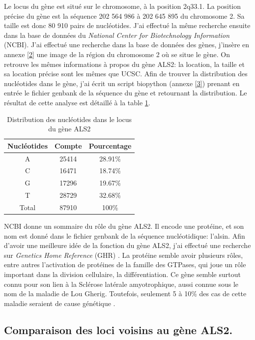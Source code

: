 \documentclass[10.9pt]{article} %
\begin{document}
Le locus du gène est situé sur le chromosome, à la position 2q33.1. La position précise du gène est la séquence 
202 564 986 à 202 645 895 du chromosome 2.
Sa taille est donc 80 910 pairs de nucléotides. J'ai effectué la même recherche ensuite dans la base de données du
\emph{National Center for Biotechnology Information} (NCBI). J'ai effectué une recherche dans la base de données des gènes,
j'insère en annexe \ref{2}  une image de la région du chromosome 2 où se situe le gène. On retrouve les mêmes informations
à propos du gène ALS2: la location, la taille et sa location précise sont les mêmes que UCSC. Afin de trouver la distribution
des nucléotides dans le gène, j'ai écrit un script biopython (annexe \ref{3}) prenant en entrée le fichier genbank de la séquence
du gène et retournant la distribution. Le résultat de cette analyse est détaillé à la table \ref{tab:first}.
\begin{table}[b]
{\small
\centering
\begin{tabular}{|c|c|c|}

 \hline
 Nucléotides & Compte & Pourcentage \\
 \hline
 A & 25414 & 28.91\% \\
 \hline
  C & 16471 & 18.74\% \\
 \hline
  G & 17296 & 19.67\% \\
 \hline
  T & 28729 & 32.68\% \\
 \hline
  Total & 87910 & 100\% \\
 \hline
 \end{tabular}
\caption{{\small Distribution des nucléotides dans le locus du gène ALS2}}
\label{tab:first}
}
\end{table}

NCBI donne un sommaire du rôle du gène ALS2. Il encode une protéine, et son nom est donné dans le fichier genbank de la séquence
nucléotidique: l'alsin. Afin d'avoir une meilleure idée de la fonction du gène ALS2, j'ai effectué une recherche sur 
\emph{Genetics Home Reference} (GHR) \cite{Genetics Home Reference}. La protéine semble avoir plusieurs rôles, entre autres l'activation de 
protéines de la famille des GTPases, qui joue un rôle important dans la division cellulaire, la différentiation. Ce gène semble surtout
connu pour son lien à la Sclérose latérale amyotrophique, aussi connue sous le nom de la maladie de Lou Gherig. 
Toutefois, seulement 5 à 10\% des cas de cette maladie seraient de cause génétique \cite{Wikipedia-SAL}.

\subsection[Loci voisins du gène ALS2]{Comparaison des loci voisins au gène ALS2.}
\end{document}
